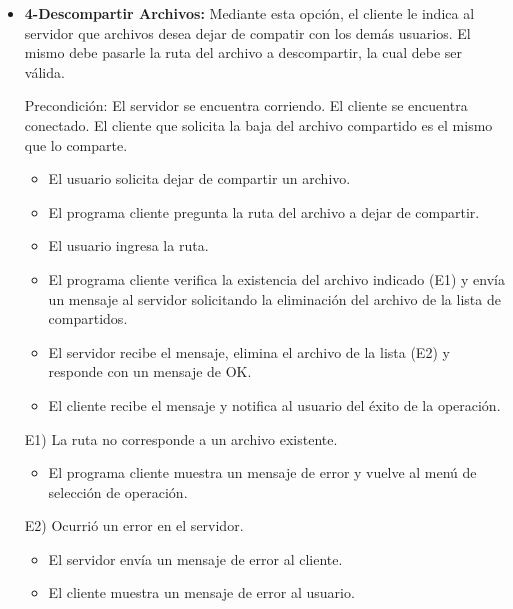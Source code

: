 \documentclass[a4paper,10pt]{article}
\begin{document}
\begin{itemize}
                E1) La ruta no corresponde a un archivo existente.
                    \begin{itemize}
                        \item El programa cliente muestra un mensaje de error y vuelve al men\'u de selecci\'on de operaci\'on.
				    \end{itemize}
                
                \item \textbf{4-Descompartir Archivos:} Mediante esta opci\'on, el cliente le indica al servidor que archivos desea dejar de compatir con los 
				dem\'as usuarios. El mismo debe pasarle la ruta del archivo a descompartir, la cual debe ser v\'alida.
				
                
                Precondici\'on: El servidor se encuentra corriendo. El cliente se encuentra conectado. El cliente que solicita la baja del archivo compartido es el mismo que lo comparte.
                \begin{itemize}
                    \item El usuario solicita dejar de compartir un archivo.
                    \item El programa cliente pregunta la ruta del archivo a dejar de compartir.
                    \item El usuario ingresa la ruta.
                    \item El programa cliente verifica la existencia del archivo indicado (E1) y env\'ia un mensaje al servidor solicitando la eliminaci\'on del archivo de la lista de compartidos.
                    \item El servidor recibe el mensaje, elimina el archivo de la lista (E2) y responde con un mensaje de OK.
                    \item El cliente recibe el mensaje y notifica al usuario del \'exito de la operaci\'on.
                \end{itemize}

                E1) La ruta no corresponde a un archivo existente.
                \begin{itemize}
                    \item El programa cliente muestra un mensaje de error y vuelve al men\'u de selecci\'on de operaci\'on.
                \end{itemize}
                
                E2) Ocurri\'o un error en el servidor.
                \begin{itemize}
                    \item El servidor env\'ia un mensaje de error al cliente.
                    \item El cliente muestra un mensaje de error al usuario.
                \end{itemize}


\end{itemize}
\end{document}
